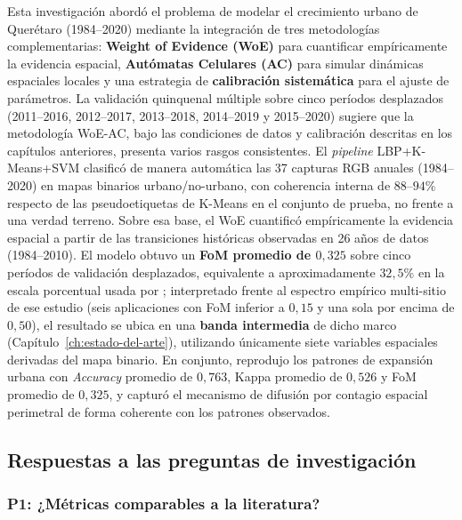 Esta investigación abordó el problema de modelar el crecimiento urbano de Querétaro (1984--2020) mediante la integración de tres metodologías complementarias: \textbf{Weight of Evidence (WoE)} para cuantificar empíricamente la evidencia espacial, \textbf{Autómatas Celulares (AC)} para simular dinámicas espaciales locales y una estrategia de \textbf{calibración sistemática} para el ajuste de parámetros. La validación quinquenal múltiple sobre cinco períodos desplazados (2011--2016, 2012--2017, 2013--2018, 2014--2019 y 2015--2020) sugiere que la metodología WoE-AC, bajo las condiciones de datos y calibración descritas en los capítulos anteriores, presenta varios rasgos consistentes. El \textit{pipeline} LBP+K-Means+SVM clasificó de manera automática las 37 capturas RGB anuales (1984--2020) en mapas binarios urbano/no-urbano, con coherencia interna de $88$--$94$\% respecto de las pseudoetiquetas de K-Means en el conjunto de prueba, no frente a una verdad terreno. Sobre esa base, el WoE cuantificó empíricamente la evidencia espacial a partir de las transiciones históricas observadas en 26 años de datos (1984--2010). El modelo obtuvo un \textbf{FoM promedio de $0{,}325$} sobre cinco períodos de validación desplazados, equivalente a aproximadamente $32{,}5$\% en la escala porcentual usada por \textcite{pontius2008comparing}; interpretado frente al espectro empírico multi-sitio de ese estudio (seis aplicaciones con FoM inferior a $0{,}15$ y una sola por encima de $0{,}50$), el resultado se ubica en una \textbf{banda intermedia} de dicho marco (Capítulo~\ref{ch:estado-del-arte}), utilizando únicamente siete variables espaciales derivadas del mapa binario. En conjunto, reprodujo los patrones de expansión urbana con \textit{Accuracy} promedio de $0{,}763$, Kappa promedio de $0{,}526$ y FoM promedio de $0{,}325$, y capturó el mecanismo de difusión por contagio espacial perimetral de forma coherente con los patrones observados.

\subsection{Respuestas a las preguntas de investigación}

\subsubsection{P1: ¿Métricas comparables a la literatura?}


